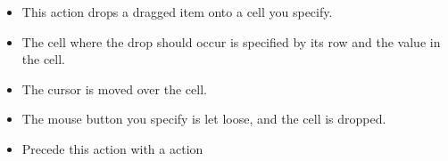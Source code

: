 
\begin{itemize}
\item This action drops a dragged item onto a cell you specify.
\item The cell where the drop should occur is specified by its row and the value in the cell.
\item The cursor is moved over the cell.
\item The mouse button you specify is let loose, and the cell is dropped. 
\item Precede this action with a  action
\end{itemize}

